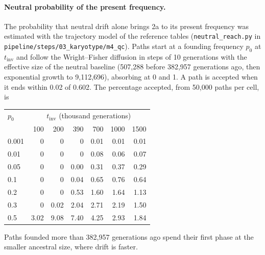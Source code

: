 \documentclass[11pt]{article}
\begin{document}
\paragraph{Neutral probability of the present frequency.}
The probability that neutral drift alone brings 2a to its present frequency was estimated with the trajectory model of the reference tables (\texttt{neutral\_reach.py} in \texttt{pipeline/steps/03\_karyotype/m4\_qc}). Paths start at a founding frequency $p_0$ at $t_\mathrm{inv}$ and follow the Wright--Fisher diffusion in steps of 10 generations with the effective size of the neutral baseline (507{,}288 before 382{,}957 generations ago, then exponential growth to 9{,}112{,}696), absorbing at 0 and 1. A path is accepted when it ends within 0.02 of 0.602. The percentage accepted, from 50{,}000 paths per cell, is
\begin{center}\small
  \begin{tabular}{lrrrrrr}
    \toprule
    $p_0$ & \multicolumn{6}{c}{$t_\mathrm{inv}$ (thousand generations)}\\
     & 100 & 200 & 390 & 700 & 1000 & 1500 \\
    \midrule
    0.001 & 0 & 0 & 0 & 0.01 & 0.01 & 0.01 \\
    0.01 & 0 & 0 & 0 & 0.08 & 0.06 & 0.07 \\
    0.05 & 0 & 0 & 0.00 & 0.31 & 0.37 & 0.29 \\
    0.1 & 0 & 0 & 0.04 & 0.65 & 0.76 & 0.64 \\
    0.2 & 0 & 0 & 0.53 & 1.60 & 1.64 & 1.13 \\
    0.3 & 0 & 0.02 & 2.04 & 2.71 & 2.19 & 1.50 \\
    0.5 & 3.02 & 9.08 & 7.40 & 4.25 & 2.93 & 1.84 \\
    \bottomrule
  \end{tabular}
\end{center}
Paths founded more than 382{,}957 generations ago spend their first phase at the smaller ancestral size, where drift is faster.
\end{document}
